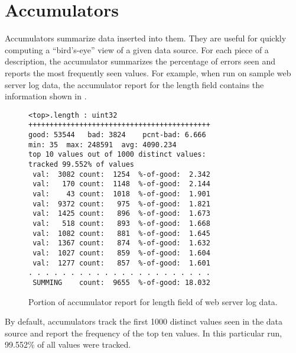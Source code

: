 \chapter{Accumulators}
\label{chap:accumulators}

Accumulators summarize data inserted into them.  They are useful for
quickly computing a ``bird's-eye'' view of a given data source.  For
each piece of a \pads{} description, the accumulator summarizes the
percentage of errors seen and reports the most frequently seen values.
For example, 
when run on sample web server log data, 
the accumulator report for the length field contains the information
shown in .
%
\begin{figure*}
\begin{small}
\begin{verbatim}
<top>.length : uint32
+++++++++++++++++++++++++++++++++++++++++++
good: 53544   bad: 3824    pcnt-bad: 6.666
min: 35  max: 248591  avg: 4090.234
top 10 values out of 1000 distinct values:
tracked 99.552% of values
 val:  3082 count:  1254  %-of-good:  2.342
 val:   170 count:  1148  %-of-good:  2.144
 val:    43 count:  1018  %-of-good:  1.901
 val:  9372 count:   975  %-of-good:  1.821
 val:  1425 count:   896  %-of-good:  1.673
 val:   518 count:   893  %-of-good:  1.668
 val:  1082 count:   881  %-of-good:  1.645
 val:  1367 count:   874  %-of-good:  1.632
 val:  1027 count:   859  %-of-good:  1.604
 val:  1277 count:   857  %-of-good:  1.601
. . . . . . . . . . . . . . . . . . . . . . 
 SUMMING    count:  9655  %-of-good: 18.032
\end{verbatim}
\end{small}
\caption{Portion of accumulator report for length field of web server
  log data.}
\label{figure:wsl-accum-report-2}
\end{figure*}
%
By default, accumulators track the first 1000 distinct
values seen in the data source and report the frequency
of the top ten values.  In this particular run, 99.552\%
of all values were tracked. 

